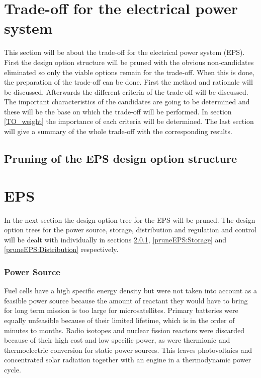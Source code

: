 \section{Trade-off for the electrical power system}
\label{TO_EPS}
This section will be about the trade-off for the electrical power system (EPS). First the design option structure will be pruned
with the obvious non-candidates eliminated so only the viable options remain for the trade-off.
When this is done, the preparation of the trade-off can be done. First the method and rationale will be discussed.
Afterwards the different criteria of the trade-off will be discussed. The important characteristics of the candidates are going to be
determined and these will be the base on which the trade-off will be performed. In section \ref{TO_weight} the importance of each criteria
will be determined. The last section will give a summary of the whole trade-off with the corresponding results.

\subsection{Pruning of the EPS design option structure}
\section{\acl{EPS}}
\label{pruneEPS}
In the next section the design option tree for the \ac{EPS} will be pruned. The design option trees for the power source, storage, distribution and regulation and control will be dealt with individually in sections \ref{pruneEPS:Source}, \ref{pruneEPS:Storage} and \ref{pruneEPS:Distribution} respectively.

\subsubsection{Power Source}
\label{pruneEPS:Source}
Fuel cells have a high specific energy density but were not taken into account as a feasible power source because the amount of reactant they would have to bring for long term mission is too large for microsatellites. Primary batteries were equally unfeasible because of their limited lifetime, which is in the order of minutes to months. Radio isotopes and nuclear fission reactors were discarded because of their high cost and low specific power, as were thermionic and thermoelectric conversion for static power sources.
This leaves photovoltaics and concentrated solar radiation together with an engine in a thermodynamic power cycle.

